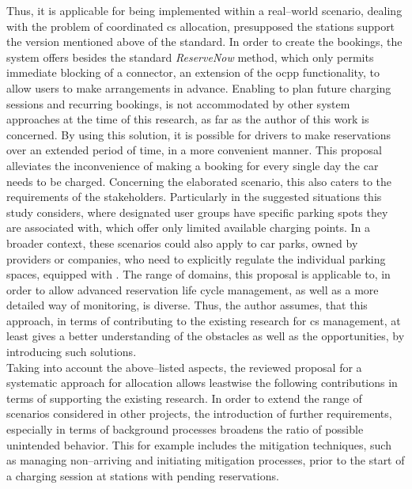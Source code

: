 Thus, it is applicable for being implemented within a real--world scenario, dealing with the problem of coordinated \acrshort{cs} allocation, presupposed the stations support the version mentioned above of the standard. 
In order to create the bookings, the system offers besides the standard \textit{ReserveNow} method, which only permits immediate blocking of a connector, an extension of the \acrshort{ocpp} functionality, to allow users to make arrangements in advance.
Enabling  to plan future charging sessions and recurring bookings, is not accommodated by other system approaches at the time of this research, as far as the author of this work is concerned.
By using this solution, it is possible for drivers to make reservations over an extended period of time, in a more convenient manner. This proposal alleviates the inconvenience of making a booking for every single day the car needs to be charged.
Concerning the elaborated scenario, this also caters to the requirements of the stakeholders. 
Particularly in the suggested situations this study considers, where designated user groups have specific parking spots they are associated with, which offer only limited available charging points.
In a broader context, these scenarios could also apply to car parks, owned by providers or companies, who need to explicitly regulate the individual parking spaces, equipped with .
The range of domains, this proposal is applicable to, in order to allow advanced reservation life cycle management, as well as a more detailed way of monitoring, is diverse.
Thus, the author assumes, that this approach, in terms of contributing to the existing research for \acrshort{cs} management, at least gives a better understanding of the obstacles as well as the opportunities, by introducing such solutions. \\
\noindent Taking into account the above--listed aspects, the reviewed proposal for a systematic approach for  allocation allows leastwise the following contributions in terms of supporting the existing research.
In order to extend the range of scenarios considered in other projects, the introduction of further requirements, especially in terms of background processes broadens the ratio of possible unintended behavior. 
This for example includes the mitigation techniques, such as managing non--arriving  and initiating mitigation processes, prior to the start of a charging session at stations with pending reservations.
